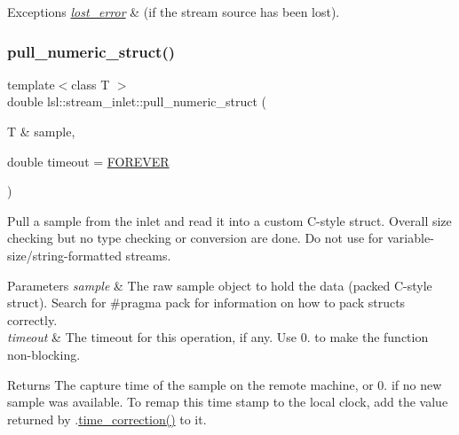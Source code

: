 \begin{DoxyExceptions}{Exceptions}
{\em \hyperlink{classlsl_1_1lost__error}{lost\+\_\+error}} & (if the stream source has been lost). \\
\hline
\end{DoxyExceptions}
\mbox{\label{classlsl_1_1stream__inlet_a540c7ba2c23188916ffe311c26c2c081}} 
\subsubsection{\texorpdfstring{pull\+\_\+numeric\+\_\+struct()}{pull\_numeric\_struct()}}
{\footnotesize\ttfamily template$<$class T $>$ \\
double lsl\+::stream\+\_\+inlet\+::pull\+\_\+numeric\+\_\+struct (\begin{DoxyParamCaption}\item[{T \&}]{sample,  }\item[{double}]{timeout = {\ttfamily \hyperlink{namespacelsl_a74cfbc9077aca21295117217249721ed}{F\+O\+R\+E\+V\+ER}} }\end{DoxyParamCaption})\hspace{0.3cm}{\ttfamily [inline]}}

Pull a sample from the inlet and read it into a custom C-\/style struct. Overall size checking but no type checking or conversion are done. Do not use for variable-\/size/string-\/formatted streams. 
\begin{DoxyParams}{Parameters}
{\em sample} & The raw sample object to hold the data (packed C-\/style struct). Search for \#pragma pack for information on how to pack structs correctly. \\
\hline
{\em timeout} & The timeout for this operation, if any. Use 0. to make the function non-\/blocking. \\
\hline
\end{DoxyParams}
\begin{DoxyReturn}{Returns}
The capture time of the sample on the remote machine, or 0. if no new sample was available. To remap this time stamp to the local clock, add the value returned by .\hyperlink{classlsl_1_1stream__inlet_a845d95f5fc60fb9cd01fb73d3da75e94}{time\+\_\+correction()} to it. 
\end{DoxyReturn}

